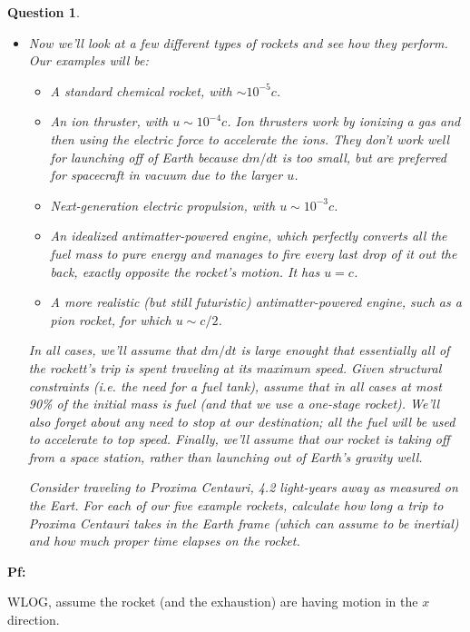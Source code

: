 \documentclass{article}
\newtheorem{question}{Question}
\begin{document}
\begin{question}
\begin{itemize}
        \item[(d)] Now we'll look at a few different types of rockets and see how they perform. Our examples will be:
        \begin{itemize}
            \item[i.] A standard chemical rocket, with $\sim 10^{-5}c$.
            \item[ii.] An ion thruster, with $u\sim 10^{-4}c$. Ion thrusters work by ionizing a gas and then using the electric force to accelerate the ions. They don't work well for launching off of Earth because $dm/dt$ is too small, but are preferred for spacecraft in vacuum due to the larger $u$.
            \item[iii.] Next-generation electric propulsion, with $u\sim 10^{-3}c$.
            \item[iv.] An idealized antimatter-powered engine, which perfectly converts all the fuel mass to pure energy and manages to fire every last drop of it out the back, exactly opposite the rocket's motion. It has $u=c$.
            \item[v.] A more realistic (but still futuristic) antimatter-powered engine, such as a pion rocket, for which $u\sim c/2$.    
        \end{itemize}
        In all cases, we'll assume that $dm/dt$ is large enought that essentially all of the rockett's trip is spent traveling at its maximum speed. Given structural constraints (i.e. the need for a fuel tank), assume that in all cases at most 90\% of the initial mass is fuel (and that we use a one-stage rocket). We'll also forget about any need to stop at our destination; all the fuel will be used to accelerate to top speed. Finally, we'll assume that our rocket is taking off from a space station, rather than launching out of Earth's gravity well.

        Consider traveling to Proxima Centauri, 4.2 light-years away as measured on the Eart. For each of our five example rockets, calculate how long a trip to Proxima Centauri takes in the Earth frame (which can assume to be inertial) and how much proper time elapses on the rocket.
    \end{itemize}
\end{question}

\textbf{Pf:}

WLOG, assume the rocket (and the exhaustion) are having motion in the $x$ direction.
\end{document}
